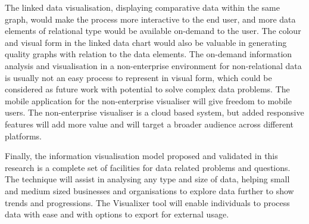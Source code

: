 The linked data visualisation, displaying comparative data within the same graph, would make the process more interactive to the end user, and more data elements of relational type would be available on-demand to the user. The colour and visual form in the linked data chart would also be valuable in generating quality graphs with relation to the data elements. The on-demand information analysis and visualisation in a non-enterprise environment for non-relational data is usually not an easy process to represent in visual form, which could be considered as future work with potential to solve complex data problems. The mobile application for the non-enterprise visualiser will give freedom to mobile users. The non-enterprise visualiser is a cloud based system, but added responsive features will add more value and will target a broader audience across different platforms. 

Finally, the information visualisation model proposed and validated in this research is a complete set of facilities for data related problems and questions. The technique will assist in analysing any type and size of data, helping small and medium sized businesses and organisations to explore data further to show trends and progressions. The Visualixer tool will enable individuals to process data with ease and with options to export for external usage.
